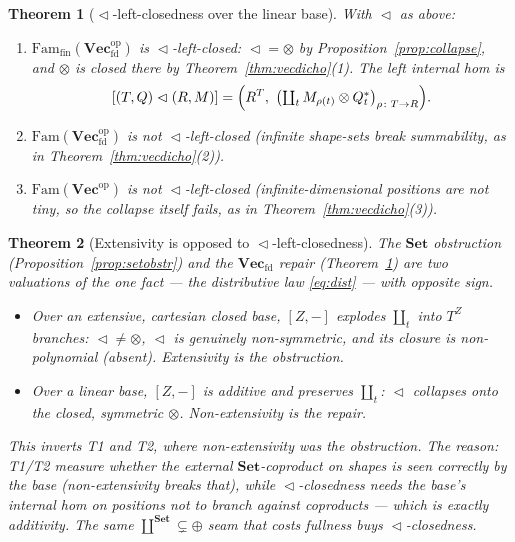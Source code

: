 \documentclass[11pt]{amsart}
\theoremstyle{plain}
\newtheorem{theorem}{Theorem}[section]
\theoremstyle{definition}
\theoremstyle{remark}
\newcommand{\Set}{\mathbf{Set}}
\newcommand{\Vect}{\mathbf{Vec}}
\newcommand{\Vecfd}{\mathbf{Vec}_{\mathrm{fd}}}
\newcommand{\Fam}{\mathrm{Fam}}
\newcommand{\ihom}[2]{[#1,#2]}
\renewcommand{\lhd}{\vartriangleleft}
\newcommand{\op}{\mathrm{op}}
\newcommand{\coprodd}{\textstyle\coprod}
\begin{document}
\begin{theorem}[$\lhd$-left-closedness over the linear base]\label{thm:T4}
With $\lhd$ as above:
\begin{enumerate}
\item $\Fam_{\mathrm{fin}}(\Vecfd^\op)$ is $\lhd$-left-closed: $\lhd=\otimes$ by
Proposition~\ref{prop:collapse}, and $\otimes$ is closed there by Theorem~\ref{thm:vecdicho}(1). The
left internal hom is
\[
[(T,Q)\lhd(R,M)]=\Bigl(R^T,\ \bigl(\coprodd_t M_{\rho(t)}\otimes Q_t^*\bigr)_{\rho\colon T\to R}\Bigr).
\]
\item $\Fam(\Vecfd^\op)$ is not $\lhd$-left-closed (infinite shape-sets break summability, as in
Theorem~\ref{thm:vecdicho}(2)).
\item $\Fam(\Vect^\op)$ is not $\lhd$-left-closed (infinite-dimensional positions are not tiny, so
the collapse itself fails, as in Theorem~\ref{thm:vecdicho}(3)).
\end{enumerate}
\end{theorem}

\begin{theorem}[Extensivity is opposed to $\lhd$-left-closedness]\label{thm:inversion}
The $\Set$ obstruction (Proposition~\ref{prop:setobstr}) and the $\Vecfd$ repair
(Theorem~\ref{thm:T4}) are two valuations of the one fact --- the distributive law
\eqref{eq:dist} --- with opposite sign.
\begin{itemize}
\item Over an extensive, cartesian closed base, $\ihom{Z}{-}$ explodes $\coprodd_t$ into $T^Z$
branches: $\lhd\neq\otimes$, $\lhd$ is genuinely non-symmetric, and its closure is non-polynomial
(absent). Extensivity \emph{is} the obstruction.
\item Over a linear base, $\ihom{Z}{-}$ is additive and preserves $\coprodd_t$: $\lhd$ collapses onto
the closed, symmetric $\otimes$. Non-extensivity \emph{is} the repair.
\end{itemize}
This inverts T1 and T2, where non-extensivity was the obstruction. The reason: T1/T2 measure whether
the external $\Set$-coproduct on shapes is seen correctly by the base (non-extensivity breaks that),
while $\lhd$-closedness needs the base's internal hom on positions \emph{not} to branch against
coproducts --- which is exactly additivity. The same $\coprod^{\Set}\subsetneq\oplus$ seam that costs
fullness buys $\lhd$-closedness.
\end{theorem}
\end{document}
